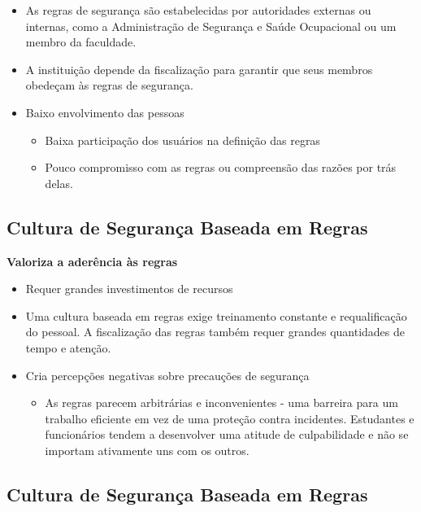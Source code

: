 \documentclass[
  letterpaper,
  DIV=11,
  numbers=noendperiod]{scrartcl}
\providecommand{\tightlist}{%
  \setlength{\itemsep}{0pt}\setlength{\parskip}{0pt}}\usepackage{longtable,booktabs,array}
\begin{document}
\begin{itemize}
\item
  As regras de segurança são estabelecidas por autoridades externas ou
  internas, como a Administração de Segurança e Saúde Ocupacional ou um
  membro da faculdade.
\item
  A instituição depende da fiscalização para garantir que seus membros
  obedeçam às regras de segurança.
\item
  Baixo envolvimento das pessoas

  \begin{itemize}
  \tightlist
  \item
    Baixa participação dos usuários na definição das regras
  \item
    Pouco compromisso com as regras ou compreensão das razões por trás
    delas.
  \end{itemize}
\end{itemize}

\subsection{Cultura de Segurança Baseada em
Regras}\label{cultura-de-seguranuxe7a-baseada-em-regras-1}

\textbf{Valoriza a aderência às regras}

\begin{itemize}
\item
  Requer grandes investimentos de recursos
\item
  Uma cultura baseada em regras exige treinamento constante e
  requalificação do pessoal. A fiscalização das regras também requer
  grandes quantidades de tempo e atenção.
\item
  Cria percepções negativas sobre precauções de segurança

  \begin{itemize}
  \tightlist
  \item
    As regras parecem arbitrárias e inconvenientes - uma barreira para
    um trabalho eficiente em vez de uma proteção contra incidentes.
    Estudantes e funcionários tendem a desenvolver uma atitude de
    culpabilidade e não se importam ativamente uns com os outros.
  \end{itemize}
\end{itemize}

\subsection{Cultura de Segurança Baseada em
Regras}\label{cultura-de-seguranuxe7a-baseada-em-regras-2}
\end{document}
